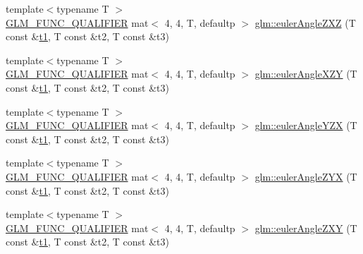\begin{DoxyCompactItemize}
\item 
{\footnotesize template$<$typename T $>$ }\\\mbox{\hyperlink{setup_8hpp_a33fdea6f91c5f834105f7415e2a64407}{G\+L\+M\+\_\+\+F\+U\+N\+C\+\_\+\+Q\+U\+A\+L\+I\+F\+I\+ER}} mat$<$ 4, 4, T, defaultp $>$ \mbox{\hyperlink{group__gtx__euler__angles_ga178f966c52b01e4d65e31ebd007e3247}{glm\+::euler\+Angle\+Z\+XZ}} (T const \&\mbox{\hyperlink{_s_d_l__opengl__glext_8h_af48031a37b713afa3b0d0d7d29653d7c}{t1}}, T const \&t2, T const \&t3)
\item 
{\footnotesize template$<$typename T $>$ }\\\mbox{\hyperlink{setup_8hpp_a33fdea6f91c5f834105f7415e2a64407}{G\+L\+M\+\_\+\+F\+U\+N\+C\+\_\+\+Q\+U\+A\+L\+I\+F\+I\+ER}} mat$<$ 4, 4, T, defaultp $>$ \mbox{\hyperlink{group__gtx__euler__angles_ga996dce12a60d8a674ba6737a535fa910}{glm\+::euler\+Angle\+X\+ZY}} (T const \&\mbox{\hyperlink{_s_d_l__opengl__glext_8h_af48031a37b713afa3b0d0d7d29653d7c}{t1}}, T const \&t2, T const \&t3)
\item 
{\footnotesize template$<$typename T $>$ }\\\mbox{\hyperlink{setup_8hpp_a33fdea6f91c5f834105f7415e2a64407}{G\+L\+M\+\_\+\+F\+U\+N\+C\+\_\+\+Q\+U\+A\+L\+I\+F\+I\+ER}} mat$<$ 4, 4, T, defaultp $>$ \mbox{\hyperlink{group__gtx__euler__angles_ga08bef16357b8f9b3051b3dcaec4b7848}{glm\+::euler\+Angle\+Y\+ZX}} (T const \&\mbox{\hyperlink{_s_d_l__opengl__glext_8h_af48031a37b713afa3b0d0d7d29653d7c}{t1}}, T const \&t2, T const \&t3)
\item 
{\footnotesize template$<$typename T $>$ }\\\mbox{\hyperlink{setup_8hpp_a33fdea6f91c5f834105f7415e2a64407}{G\+L\+M\+\_\+\+F\+U\+N\+C\+\_\+\+Q\+U\+A\+L\+I\+F\+I\+ER}} mat$<$ 4, 4, T, defaultp $>$ \mbox{\hyperlink{group__gtx__euler__angles_ga2e61f1e39069c47530acab9167852dd6}{glm\+::euler\+Angle\+Z\+YX}} (T const \&\mbox{\hyperlink{_s_d_l__opengl__glext_8h_af48031a37b713afa3b0d0d7d29653d7c}{t1}}, T const \&t2, T const \&t3)
\item 
{\footnotesize template$<$typename T $>$ }\\\mbox{\hyperlink{setup_8hpp_a33fdea6f91c5f834105f7415e2a64407}{G\+L\+M\+\_\+\+F\+U\+N\+C\+\_\+\+Q\+U\+A\+L\+I\+F\+I\+ER}} mat$<$ 4, 4, T, defaultp $>$ \mbox{\hyperlink{group__gtx__euler__angles_gab4505c54d2dd654df4569fd1f04c43aa}{glm\+::euler\+Angle\+Z\+XY}} (T const \&\mbox{\hyperlink{_s_d_l__opengl__glext_8h_af48031a37b713afa3b0d0d7d29653d7c}{t1}}, T const \&t2, T const \&t3)
\item 

\end{DoxyCompactItemize}
